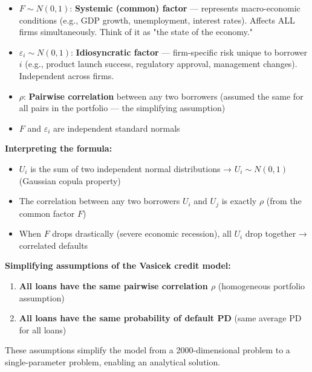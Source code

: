 \documentclass[12pt,openany]{book}
\theoremstyle{definition}
\theoremstyle{remark}
\begin{document}
\begin{itemize}
\item $F \sim N(0,1)$: \textbf{Systemic (common) factor} --- represents macro-economic conditions (e.g., GDP growth, unemployment, interest rates). Affects ALL firms simultaneously. Think of it as "the state of the economy."


\item $\varepsilon_i \sim N(0,1)$: \textbf{Idiosyncratic factor} --- firm-specific risk unique to borrower $i$ (e.g., product launch success, regulatory approval, management changes). Independent across firms.


\item $\rho$: \textbf{Pairwise correlation} between any two borrowers (assumed the same for all pairs in the portfolio --- the simplifying assumption)


\item $F$ and $\varepsilon_i$ are independent standard normals


\end{itemize}
\textbf{Interpreting the formula:}

\begin{itemize}
\item $U_i$ is the sum of two independent normal distributions → $U_i \sim N(0,1)$ (Gaussian copula property)


\item The correlation between any two borrowers $U_i$ and $U_j$ is exactly $\rho$ (from the common factor $F$)


\item When $F$ drops drastically (severe economic recession), all $U_i$ drop together → correlated defaults


\end{itemize}
\textbf{Simplifying assumptions of the Vasicek credit model:}

\begin{enumerate}
\item \textbf{All loans have the same pairwise correlation \(\rho\)} (homogeneous portfolio assumption)


\item \textbf{All loans have the same probability of default PD} (same average PD for all loans)


\end{enumerate}
These assumptions simplify the model from a 2000-dimensional problem to a single-parameter problem, enabling an analytical solution.
\end{document}
